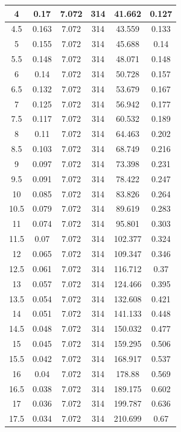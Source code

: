 \documentclass[10pt,a4paper]{article}
\begin{document}
\begin{flushleft}
\begin{itemize}
\begin{table}[H]
{\begin{subtable}[t]{.6\textwidth}
\begin{tabular}{|c|c|c|c|c|c|}
\hline
4 & 0.17 & 7.072 & 314 & 41.662 & 0.127 \\ 
\hline
4.5 & 0.163 & 7.072 & 314 & 43.559 & 0.133 \\ 
\hline
5 & 0.155 & 7.072 & 314 & 45.688 & 0.14 \\ 
\hline
5.5 & 0.148 & 7.072 & 314 & 48.071 & 0.148 \\ 
\hline
6 & 0.14 & 7.072 & 314 & 50.728 & 0.157 \\ 
\hline
6.5 & 0.132 & 7.072 & 314 & 53.679 & 0.167 \\ 
\hline
7 & 0.125 & 7.072 & 314 & 56.942 & 0.177 \\ 
\hline
7.5 & 0.117 & 7.072 & 314 & 60.532 & 0.189 \\ 
\hline
8 & 0.11 & 7.072 & 314 & 64.463 & 0.202 \\ 
\hline
8.5 & 0.103 & 7.072 & 314 & 68.749 & 0.216 \\ 
\hline
9 & 0.097 & 7.072 & 314 & 73.398 & 0.231 \\ 
\hline
9.5 & 0.091 & 7.072 & 314 & 78.422 & 0.247 \\ 
\hline
10 & 0.085 & 7.072 & 314 & 83.826 & 0.264 \\ 
\hline
10.5 & 0.079 & 7.072 & 314 & 89.619 & 0.283 \\ 
\hline
11 & 0.074 & 7.072 & 314 & 95.801 & 0.303 \\ 
\hline
11.5 & 0.07 & 7.072 & 314 & 102.377 & 0.324 \\ 
\hline
12 & 0.065 & 7.072 & 314 & 109.347 & 0.346 \\ 
\hline
12.5 & 0.061 & 7.072 & 314 & 116.712 & 0.37 \\ 
\hline
13 & 0.057 & 7.072 & 314 & 124.466 & 0.395 \\ 
\hline
13.5 & 0.054 & 7.072 & 314 & 132.608 & 0.421 \\ 
\hline
14 & 0.051 & 7.072 & 314 & 141.133 & 0.448 \\ 
\hline
14.5 & 0.048 & 7.072 & 314 & 150.032 & 0.477 \\ 
\hline
15 & 0.045 & 7.072 & 314 & 159.295 & 0.506 \\ 
\hline
15.5 & 0.042 & 7.072 & 314 & 168.917 & 0.537 \\ 
\hline
16 & 0.04 & 7.072 & 314 & 178.88 & 0.569 \\ 
\hline
16.5 & 0.038 & 7.072 & 314 & 189.175 & 0.602 \\ 
\hline
17 & 0.036 & 7.072 & 314 & 199.787 & 0.636 \\ 
\hline
17.5 & 0.034 & 7.072 & 314 & 210.699 & 0.67 \\ 

\end{tabular}
\end{subtable}}
\end{table}
\end{itemize}
\end{flushleft}
\end{document}
